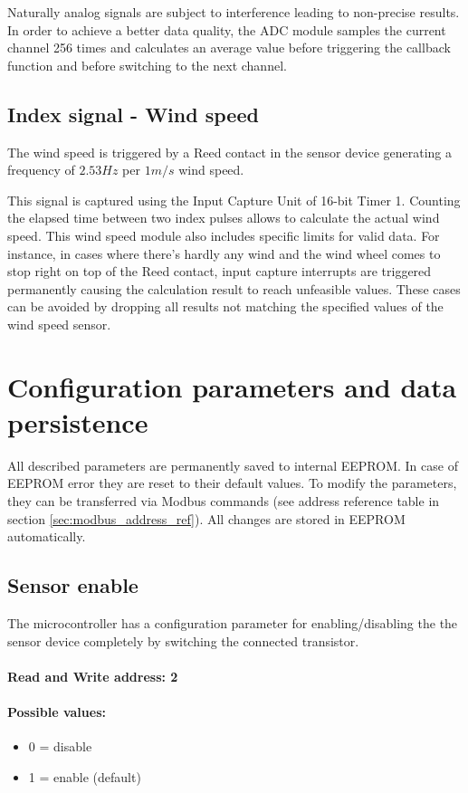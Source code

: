 Naturally analog signals are subject to interference leading to non-precise results. In order to achieve a better data quality, the ADC module samples the current channel 256 times and calculates an average value before triggering the callback function and before switching to the next channel.

\subsection{Index signal - Wind speed}
The wind speed is triggered by a Reed contact in the sensor device generating a frequency of $2.53 Hz$ per $1 m/s$ wind speed.

This signal is captured using the Input Capture Unit of 16-bit Timer 1. Counting the elapsed time between two index pulses allows to calculate the actual wind speed. This wind speed module also includes specific limits for valid data. For instance, in cases where there's hardly any wind and the wind wheel comes to stop right on top of the Reed contact, input capture interrupts are triggered permanently causing the calculation result to reach unfeasible values. These cases can be avoided by dropping all results not matching the specified values of the wind speed sensor.

\section{Configuration parameters and data persistence}
All described parameters are permanently saved to internal EEPROM. In case of EEPROM error they are reset to their default values. To modify the parameters, they can be transferred via Modbus commands (see address reference table in section \ref{sec:modbus_address_ref}). All changes are stored in EEPROM automatically.

\subsection{Sensor enable}
The microcontroller has a configuration parameter for enabling/disabling the the sensor device completely by switching the connected transistor. 

\paragraph{Read and Write address: 2}
\paragraph{Possible values:}
\begin{itemize}
    \item 0 = disable
    \item 1 = enable (default)
\end{itemize}

